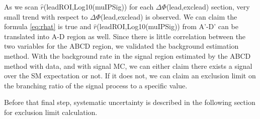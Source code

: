 As we scan $\hat{r}$(leadROI,Log10(muIPSig)) for each $\Delta\Phi$(lead,exclead) section, very small trend with respect to $\Delta\Phi$(lead,exclead) is observed.
We can claim the formula \ref{eq:rhat} is true and $\hat{r}$(leadROI,Log10(muIPSig)) from A'-D' can be translated into A-D region as well.
Since there is little correlation between the two variables for the ABCD region, we validated the background estimation method.
With the background rate in the signal region estimated by the ABCD method with data, and with signal MC, we can either claim there exists a signal over the SM expectation or not.
If it does not, we can claim an exclusion limit on the branching ratio of the signal process to a specific value.

Before that final step, systematic uncertainty is described in the following section for exclusion limit calculation.

